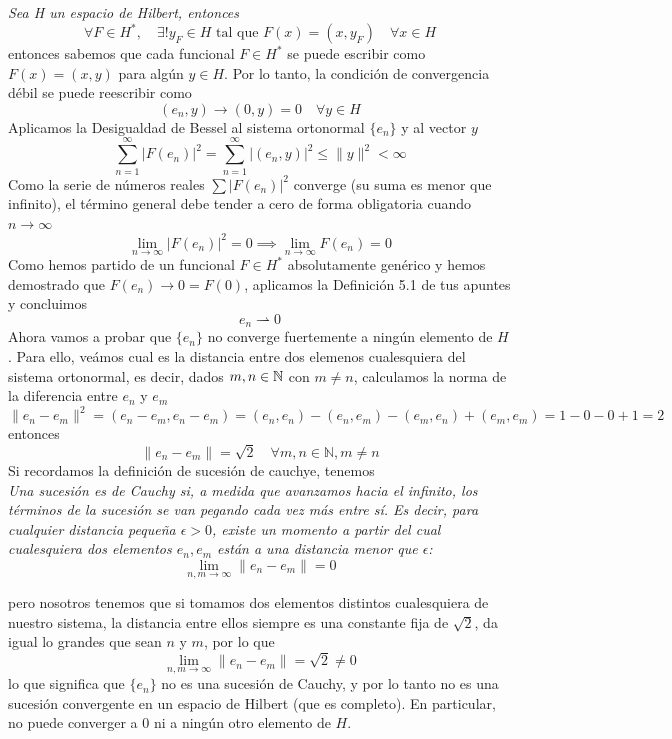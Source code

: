 \begin{ejercicio}
    \textit{ Sea H un espacio de Hilbert, entonces
    \begin{equation*}
        \forall F\in H^*, \quad \exists! y_F \in H \text{ tal que } F(x) = (x, y_F) \quad \forall x \in H
    \end{equation*}}
    \noindent
    entonces sabemos que cada funcional $F \in H^*$ se puede escribir como $F(x) = (x, y)$ para algún $y \in H$. Por lo tanto, la condición de convergencia débil se puede reescribir como
    \begin{equation*}
        (e_n, y) \longrightarrow (0, y) = 0 \quad \forall y \in H
    \end{equation*}
    Aplicamos la Desigualdad de Bessel al sistema ortonormal $\{e_n\}$ y al vector $y$
    $$\sum_{n=1}^{\infty} |F(e_n)|^2 = \sum_{n=1}^{\infty} |( e_n, y )|^2 \le \|y\|^2 < \infty$$
    Como la serie de números reales $\sum |F(e_n)|^2$ converge (su suma es menor que infinito), el término general debe tender a cero de forma obligatoria cuando $n \to \infty$
    $$\lim_{n \to \infty} |F(e_n)|^2 = 0 \implies \lim_{n \to \infty} F(e_n) = 0$$
    Como hemos partido de un funcional $F \in H^*$ absolutamente genérico y hemos demostrado que $F(e_n) \to 0 = F(0)$, aplicamos la Definición 5.1 de tus apuntes y concluimos
    $$e_n \rightharpoonup 0 $$
    Ahora vamos a probar que $\{e_n\}$ no converge fuertemente a ningún elemento de $H$. Para ello, veámos cual es la distancia entre dos elemenos cualesquiera del sistema ortonormal, es decir, dados $m,n\in \mathbb{N}$ con $m \neq n$, calculamos la norma de la diferencia entre $e_n$ y $e_m$
    $$\|e_n - e_m\|^2 = ( e_n - e_m, e_n - e_m )= (e_n, e_n) - (e_n, e_m) - (e_m, e_n) + (e_m, e_m) = 1 - 0 - 0 + 1 = 2$$
    entonces 
    \begin{equation*}
        \|e_n - e_m\| = \sqrt{2} \quad \forall m,n \in \mathbb{N}, m \neq n
    \end{equation*}
    Si recordamos la definición de sucesión de cauchye, tenemos \\
    
    \textit{Una sucesión es de Cauchy si, a medida que avanzamos hacia el infinito, los términos de la sucesión se van pegando cada vez más entre sí. Es decir, para cualquier distancia pequeña $\epsilon > 0$, existe un momento a partir del cual cualesquiera dos elementos $e_n, e_m$ están a una distancia menor que $\epsilon$:$$\lim_{n, m \to \infty} \|e_n - e_m\| = 0$$}

    \noindent
    pero nosotros tenemos que si tomamos dos elementos distintos cualesquiera de nuestro sistema, la distancia entre ellos siempre es una constante fija de $\sqrt{2}$, da igual lo grandes que sean $n$ y $m$, por lo que
    $$\lim_{n, m \to \infty} \|e_n - e_m\| = \sqrt{2} \neq 0$$
    lo que significa que $\{e_n\}$ no es una sucesión de Cauchy, y por lo tanto no es una sucesión convergente en un espacio de Hilbert (que es completo). En particular, no puede converger a $0$ ni a ningún otro elemento de $H$.
\end{ejercicio}

